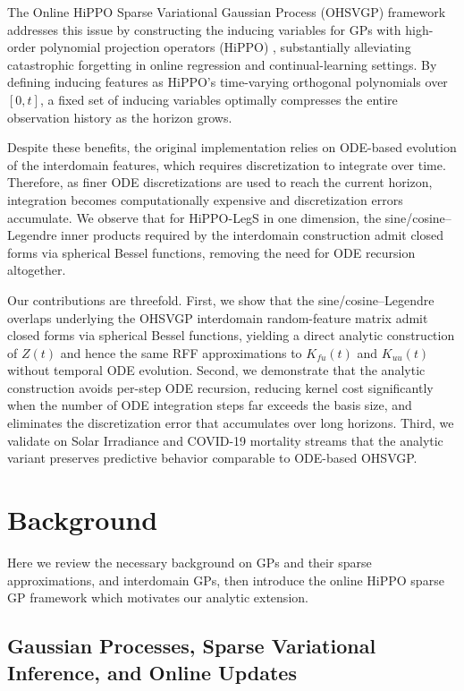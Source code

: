 \documentclass{article}
\theoremstyle{plain}
\theoremstyle{definition}
\theoremstyle{remark}
\begin{document}
The Online HiPPO Sparse Variational Gaussian Process (OHSVGP) framework \citep{Chen2025} addresses this issue by constructing the inducing variables for GPs with high-order polynomial projection operators (HiPPO) \citep{Gu2020}, substantially alleviating catastrophic forgetting in online regression and continual-learning settings. By defining inducing features as HiPPO's time-varying orthogonal polynomials over $[0,t]$, a fixed set of inducing variables optimally compresses the entire observation history as the horizon grows.

Despite these benefits, the original implementation relies on ODE-based evolution of the interdomain features, which requires discretization to integrate over time. Therefore, as finer ODE discretizations are used to reach the current horizon, integration becomes computationally expensive and discretization errors accumulate. We observe that for HiPPO-LegS in one dimension, the sine/cosine--Legendre inner products required by the interdomain construction admit closed forms via spherical Bessel functions, removing the need for ODE recursion altogether.


Our contributions are threefold. First, we show that the sine/cosine--Legendre overlaps underlying the OHSVGP interdomain random-feature matrix admit closed forms via spherical Bessel functions, yielding a direct analytic construction of $Z(t)$ and hence the same RFF approximations to $K_{fu}(t)$ and $K_{uu}(t)$ without temporal ODE evolution. Second, we demonstrate that the analytic construction avoids per-step ODE recursion, reducing kernel cost significantly when the number of ODE integration steps far exceeds the basis size, and eliminates the discretization error that accumulates over long horizons. Third, we validate on Solar Irradiance and COVID-19 mortality streams that the analytic variant preserves predictive behavior comparable to ODE-based OHSVGP.

\section{Background}

Here we review the necessary background on GPs and their sparse approximations, and interdomain GPs, then introduce the online HiPPO sparse GP framework which motivates our analytic extension.

\subsection{Gaussian Processes, Sparse Variational Inference, and Online Updates}
\end{document}
